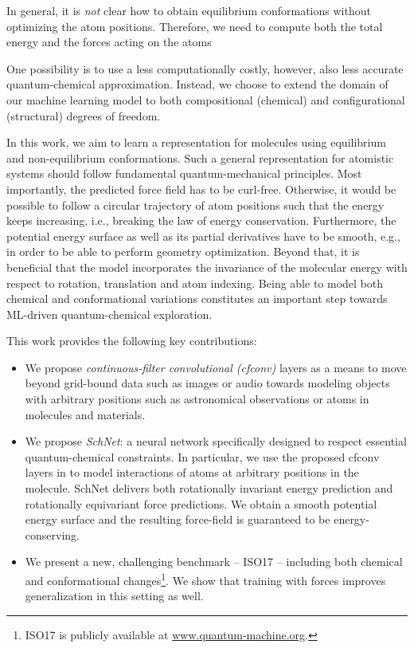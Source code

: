 \documentclass{article}
\begin{document}
In general, it is \emph{not} clear how to obtain equilibrium conformations without optimizing the atom positions.
Therefore, we need to compute both the total energy  and the forces acting on the atoms

One possibility is to use a less computationally costly, however, also less accurate quantum-chemical approximation.
Instead, we choose to extend the domain of our machine learning model to both compositional (chemical) and configurational (structural) degrees of freedom.

In this work, we aim to learn a representation for molecules using equilibrium and non-equilibrium conformations.
Such a general representation for atomistic systems should follow fundamental quantum-mechanical principles.
Most importantly, the predicted force field has to be curl-free.
Otherwise, it would be possible to follow a circular trajectory of atom positions such that the energy keeps increasing, i.e., breaking the law of energy conservation.
Furthermore, the potential energy surface as well as its partial derivatives have to be smooth, e.g., in order to be able to perform geometry optimization.
Beyond that, it is beneficial that the model incorporates the invariance of the molecular energy with respect to rotation, translation and atom indexing.
Being able to model both chemical and conformational variations constitutes an important step towards ML-driven quantum-chemical exploration.

This work provides the following key contributions:
\begin{itemize}
\item We propose \emph{continuous-filter convolutional (cfconv)} layers as a means to move beyond grid-bound data such as images or audio towards modeling objects with arbitrary positions such as astronomical observations or atoms in molecules and materials.
\item We propose \emph{SchNet}: a neural network specifically designed to respect essential quantum-chemical constraints. 
In particular, we use the proposed cfconv layers in  to model interactions of atoms at arbitrary positions in the molecule.
SchNet delivers both rotationally invariant energy prediction and rotationally equivariant force predictions. 
We obtain a smooth potential energy surface and the resulting force-field is guaranteed to be energy-conserving.
\item We present a new, challenging benchmark -- ISO17 -- including both chemical and conformational changes\footnote{ISO17 is publicly available at \url{www.quantum-machine.org}.}.
We show that training with forces improves generalization in this setting as well.
\end{itemize}
\end{document}
